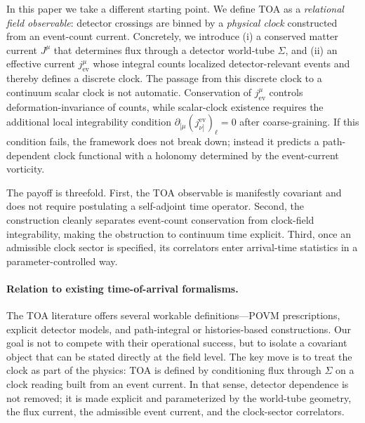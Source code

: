 \documentclass[pdflatex,sn-mathphys-num]{sn-jnl}
\theoremstyle{thmstylethree}
\theoremstyle{thmstyleone}
\theoremstyle{thmstyletwo}
\numberwithin{equation}{section}
\begin{document}
        In this paper we take a different starting point. We define TOA as a \emph{relational field observable}: detector crossings are binned by a \emph{physical clock} constructed from an event-count current. Concretely, we introduce (i) a conserved matter current $J^\mu$ that determines flux through a detector world-tube $\Sigma$, and (ii) an effective current $j^\mu_{\mathrm{ev}}$ whose integral counts localized detector-relevant events and thereby defines a discrete clock. The passage from this discrete clock to a continuum scalar clock is not automatic. Conservation of $j^\mu_{\mathrm{ev}}$ controls deformation-invariance of counts, while scalar-clock existence requires the additional local integrability condition $\partial_{[\mu}(j^{\mathrm{ev}}_{\nu]})_\ell=0$ after coarse-graining. If this condition fails, the framework does not break down; instead it predicts a path-dependent clock functional with a holonomy determined by the event-current vorticity.
        
        The payoff is threefold. First, the TOA observable is manifestly covariant and does not require postulating a self-adjoint time operator. Second, the construction cleanly separates event-count conservation from clock-field integrability, making the obstruction to continuum time explicit. Third, once an admissible clock sector is specified, its correlators enter arrival-time statistics in a parameter-controlled way.
        
        \paragraph{Relation to existing time-of-arrival formalisms.}
            The TOA literature offers several workable definitions---POVM prescriptions, explicit detector models, and path-integral or histories-based constructions. Our goal is not to compete with their operational success, but to isolate a covariant object that can be stated directly at the field level. The key move is to treat the clock as part of the physics: TOA is defined by conditioning flux through $\Sigma$ on a clock reading built from an event current. In that sense, detector dependence is not removed; it is made explicit and parameterized by the world-tube geometry, the flux current, the admissible event current, and the clock-sector correlators.
        
\end{document}
